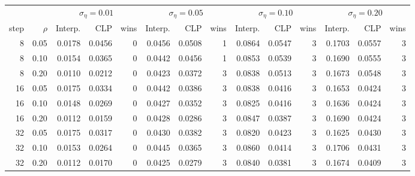 \begin{tabular}{rrrrrrrrrrrrrr}
\toprule
& & \multicolumn{3}{c}{$\sigma_{\eta}=0.01$} & \multicolumn{3}{c}{$\sigma_{\eta}=0.05$} & \multicolumn{3}{c}{$\sigma_{\eta}=0.10$} & \multicolumn{3}{c}{$\sigma_{\eta}=0.20$} \\
\cmidrule(lr){3-5} \cmidrule(lr){6-8} \cmidrule(lr){9-11} \cmidrule(lr){12-14}
step & $\rho$ & Interp. & CLP & wins & Interp. & CLP & wins & Interp. & CLP & wins & Interp. & CLP & wins \\
\midrule
8 & 0.05 & 0.0178 & 0.0456 & 0 & 0.0456 & 0.0508 & 1 & 0.0864 & 0.0547 & 3 & 0.1703 & 0.0557 & 3 \\
8 & 0.10 & 0.0154 & 0.0365 & 0 & 0.0442 & 0.0456 & 1 & 0.0853 & 0.0539 & 3 & 0.1690 & 0.0555 & 3 \\
8 & 0.20 & 0.0110 & 0.0212 & 0 & 0.0423 & 0.0372 & 3 & 0.0838 & 0.0513 & 3 & 0.1673 & 0.0548 & 3 \\
16 & 0.05 & 0.0175 & 0.0334 & 0 & 0.0442 & 0.0386 & 3 & 0.0838 & 0.0416 & 3 & 0.1653 & 0.0424 & 3 \\
16 & 0.10 & 0.0148 & 0.0269 & 0 & 0.0427 & 0.0352 & 3 & 0.0825 & 0.0416 & 3 & 0.1636 & 0.0424 & 3 \\
16 & 0.20 & 0.0112 & 0.0159 & 0 & 0.0428 & 0.0286 & 3 & 0.0847 & 0.0387 & 3 & 0.1690 & 0.0424 & 3 \\
32 & 0.05 & 0.0175 & 0.0317 & 0 & 0.0430 & 0.0382 & 3 & 0.0820 & 0.0423 & 3 & 0.1625 & 0.0430 & 3 \\
32 & 0.10 & 0.0153 & 0.0264 & 0 & 0.0445 & 0.0365 & 3 & 0.0860 & 0.0414 & 3 & 0.1706 & 0.0431 & 3 \\
32 & 0.20 & 0.0112 & 0.0170 & 0 & 0.0425 & 0.0279 & 3 & 0.0840 & 0.0381 & 3 & 0.1674 & 0.0409 & 3 \\
\bottomrule
\end{tabular}
